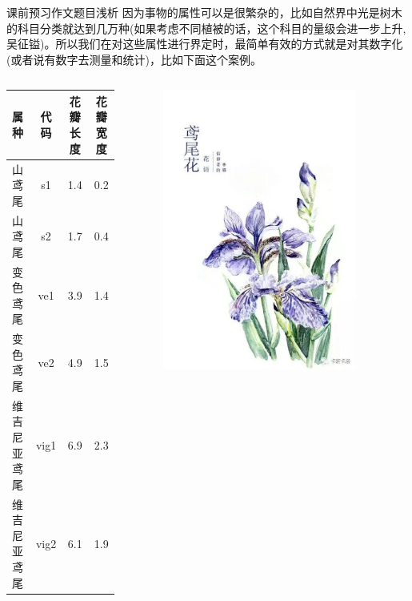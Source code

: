 \documentclass[handout]{beamer}
\begin{document}
\begin{frame}{课前预习作文题目浅析}
	因为事物的属性可以是很繁杂的，比如自然界中光是树木的科目分类就达到几万种(如果考虑不同植被的话，这个科目的量级会进一步上升, 吴征镒)。所以我们在对这些属性进行界定时，最简单有效的方式就是对其数字化(或者说有数字去测量和统计)，比如下面这个案例。
	
	\begin{columns}
	\begin{column}{0.7\textwidth}
		\begin{table}[H]
		\centering
		\begin{tabular}{lccc}
		\hline 
			属种 & 代码 &花瓣长度 & 花瓣宽度 \\
			\hline 
			山鸢尾 & s1 & 1.4 & 0.2 \\
			山鸢尾 & s2 & 1.7 & 0.4 \\
			变色鸢尾 & ve1 & 3.9  & 1.4 \\
			变色鸢尾 & ve2& 4.9 & 1.5 \\
			维吉尼亚鸢尾 & vig1 & 6.9 & 2.3  \\
			维吉尼亚鸢尾 & vig2 & 6.1 & 1.9 \\
			\hline  
		\end{tabular}
\end{table}
	\end{column}
	\begin{column}{0.3\textwidth}
	\begin{figure}[H]
		\centering
		\includegraphics[width=0.9\textwidth]{fig/iris}
	\end{figure}	
	\end{column}
\end{columns}
\end{frame}
\end{document}
